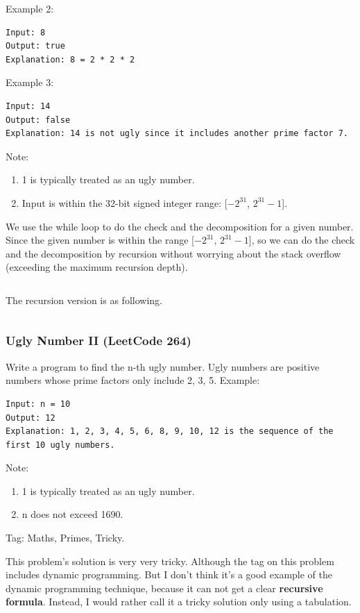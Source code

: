 \documentclass[11pt]{article}
\begin{document}
Example 2:
\begin{verbatim}
Input: 8
Output: true
Explanation: 8 = 2 * 2 * 2
\end{verbatim}

Example 3:
\begin{verbatim}
Input: 14
Output: false 
Explanation: 14 is not ugly since it includes another prime factor 7.
\end{verbatim}

Note:
\begin{enumerate}
	\item 1 is typically treated as an ugly number.
	\item Input is within the 32-bit signed integer range: [$-2^{31}$, $2^{31}-1$].
\end{enumerate}

We use the while loop to do the check and the decomposition for a given number. Since the given number is within the range [$-2^{31}$, $2^{31}-1$], so we can do the check and the decomposition by recursion without worrying about the stack overflow (exceeding the maximum recursion depth). 
\inputminted[breaklines=true,frame=leftline, linenos=true]{python}{src/isUgly.py}

The recursion version is as following. 
\inputminted[breaklines=true,frame=leftline, linenos=true]{python}{src/isUgly_recursion.py}

\subsubsection{Ugly Number II (LeetCode 264)}
Write a program to find the n-th ugly number. 
Ugly numbers are positive numbers whose prime factors only include 2, 3, 5. 
Example:
\begin{verbatim}
Input: n = 10
Output: 12
Explanation: 1, 2, 3, 4, 5, 6, 8, 9, 10, 12 is the sequence of the first 10 ugly numbers.
\end{verbatim}
Note:  
\begin{enumerate}
\item 1 is typically treated as an ugly number.
\item n does not exceed 1690.
\end{enumerate}

Tag: Maths, Primes, Tricky.

This problem's solution is very very tricky.
Although the tag on this problem includes dynamic programming. 
But I don't think it's a good example of the dynamic programming technique, because it can not get a clear \textbf{recursive formula}.
Instead, I would rather call it a tricky solution only using a tabulation. 
\end{document}
